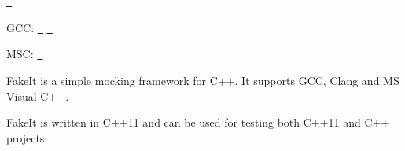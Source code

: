 \href{https://gitter.im/eranpeer/FakeIt?utm_source=badge&utm_medium=badge&utm_campaign=pr-badge&utm_content=badge}{\texttt{ }}

G\+CC\+: \href{https://travis-ci.org/eranpeer/FakeIt}{\texttt{ }} \href{https://coveralls.io/github/eranpeer/FakeIt?branch=master}{\texttt{ }}

M\+SC\+: \href{https://ci.appveyor.com/project/eranpeer/fakeit}{\texttt{ }}

Fake\+It is a simple mocking framework for C++. It supports G\+CC, Clang and MS Visual C++.

Fake\+It is written in C++11 and can be used for testing both C++11 and C++ projects.


\begin{DoxyCode}{0}
\DoxyCodeLine{\};}
\end{DoxyCode}
 
